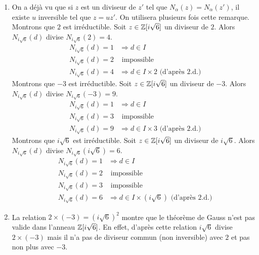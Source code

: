 \begin{enumerate}
\begin{enumerate}
    \item On a déjà vu que si $z$ est un diviseur de $z'$ tel que $N_{\alpha}(z)=N_{\alpha}(z')$, il existe $u$ inversible tel que $z=uz'$. On utilisera plusieurs fois cette remarque.\newline
    Montrons que $2$ est irréductible.\newline
    Soit $z\in \mathbb{Z}[i\sqrt{6}]$ un diviseur de $2$. Alors $N_{i\sqrt{6}}(d)$ divise $N_{i\sqrt{6}}(2)=4$.
    \begin{align*}
       &N_{i\sqrt{6}}(d)=1 &\Rightarrow d\in I \\
       &N_{i\sqrt{6}}(d)=2 &\text{ impossible} \\
       &N_{i\sqrt{6}}(d)=4 &\Rightarrow d\in I\times 2 \text{ (d'après 2.d.) }
    \end{align*}
    Montrons que $-3$ est irréductible.\newline
    Soit $z\in \mathbb{Z}[i\sqrt{6}]$ un diviseur de $-3$. Alors $N_{i\sqrt{6}}(d)$ divise $N_{i\sqrt{6}}(-3)=9$.
    \begin{align*}
       &N_{i\sqrt{6}}(d)=1 &\Rightarrow d\in I \\
       &N_{i\sqrt{6}}(d)=3 &\text{ impossible} \\
       &N_{i\sqrt{6}}(d)=9 &\Rightarrow d\in I\times 3 \text{ (d'après 2.d.) }
    \end{align*}
    Montrons que $i\sqrt{6}$ est irréductible.\newline
    Soit $z\in \mathbb{Z}[i\sqrt{6}]$ un diviseur de $i\sqrt{6}$. Alors $N_{i\sqrt{6}}(d)$ divise $N_{i\sqrt{6}}(i\sqrt{6})=6$.
    \begin{align*}
       &N_{i\sqrt{6}}(d)=1 &\Rightarrow d\in I \\
       &N_{i\sqrt{6}}(d)=2 &\text{ impossible} \\
       &N_{i\sqrt{6}}(d)=3 &\text{ impossible} \\
       &N_{i\sqrt{6}}(d)=6 &\Rightarrow d\in I\times(i\sqrt{6}) \text{ (d'après 2.d.) }
    \end{align*}

    \item La relation $2\times (-3) = (i\sqrt{6})^2$ montre que le théorème de Gauss n'est pas valide dans l'anneau $\mathbb{Z}[i\sqrt{6}]$. En effet, d'après cette relation $i\sqrt{6}$ divise $2\times (-3)$ mais il n'a pas de diviseur commun (non inversible) avec $2$ et pas non plus avec $-3$.  
  \end{enumerate}
  

\end{enumerate}
